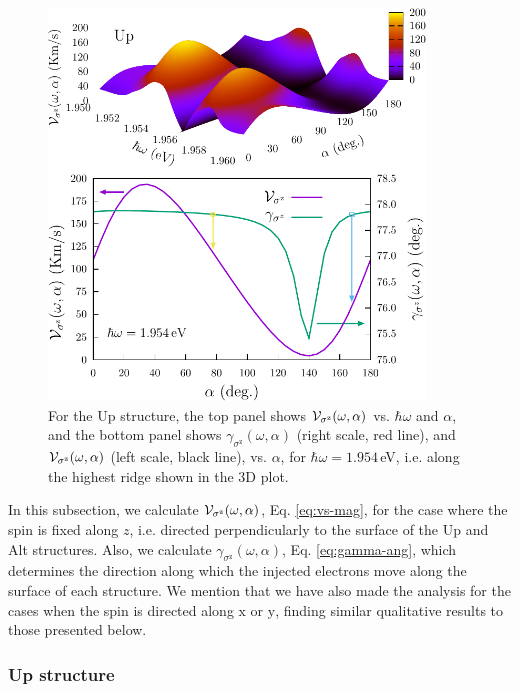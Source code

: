 \documentclass[floatfix,prb,aps,superscriptaddress,showpacs,11pt,preprint,letterpaper]{revtex4}
\def\tama{10cm}
\begin{document}
\begin{figure}[t]
\centering
\includegraphics[width=\tama]{figures/fig5}
\caption{For the Up structure, the top panel shows ${\cal V}_{\sigma^\mathrm{z}}
(\omega,\alpha)$ vs. $\hbar\omega$ and $\alpha$, and the bottom panel shows
$\gamma_{\sigma^\mathrm{z}} (\omega,\alpha)$ (right scale, red line), and ${\cal
V}_{\sigma^\mathrm{z}} (\omega,\alpha)$ (left scale, black line), vs. $\alpha$,
for $\hbar\omega=1.954$\,eV, i.e. along the highest ridge shown in the 3D plot.
}
\label{fig:up-vsz-w2}
\end{figure}

In this subsection, we calculate ${\cal V}_{\sigma^\mathrm{z}}(\omega,\alpha)$,
Eq. \eqref{eq:vs-mag}, for the case where the spin is fixed along $z$, i.e.
directed perpendicularly to the surface of the Up and Alt structures. Also, we
calculate $\gamma_{\sigma^\mathrm{z}}(\omega,\alpha)$, Eq. \eqref{eq:gamma-ang},
which determines the direction along which the injected electrons move along the
surface of  each structure. We mention that we have also made the analysis for
the cases when the spin  is directed along $\mathrm{x}$ or $\mathrm{y}$, finding
similar qualitative results to those presented below.

\subsubsection{Up structure}\label{up:fs}
\end{document}
